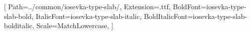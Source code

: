\usepackage{amsmath}
\usepackage{fontspec}
\usepackage{fourier-otf} %
\setmonofont{iosevka-type-slab-regular}[
  Path=../common/iosevka-type-slab/,
  Extension=.ttf,
  BoldFont=iosevka-type-slab-bold,
  ItalicFont=iosevka-type-slab-italic,
  BoldItalicFont=iosevka-type-slab-bolditalic,
  Scale=MatchLowercase,
]
